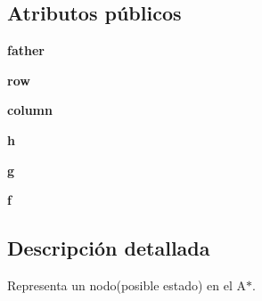 \subsection*{\-Atributos públicos}
\begin{DoxyCompactItemize}
\item 
\hypertarget{classengine_1_1astar_1_1Nodo_a2bccf625e0e53d558ea912c6a22961f4}{
{\bfseries father}}
\label{classengine_1_1astar_1_1Nodo_a2bccf625e0e53d558ea912c6a22961f4}

\item 
\hypertarget{classengine_1_1astar_1_1Nodo_a3d42a34fb8f7ec3e279e94fac8f38cda}{
{\bfseries row}}
\label{classengine_1_1astar_1_1Nodo_a3d42a34fb8f7ec3e279e94fac8f38cda}

\item 
\hypertarget{classengine_1_1astar_1_1Nodo_adca0b6a4acfbaeb84f5716b76b493d91}{
{\bfseries column}}
\label{classengine_1_1astar_1_1Nodo_adca0b6a4acfbaeb84f5716b76b493d91}

\item 
\hypertarget{classengine_1_1astar_1_1Nodo_a93acca2eb6056e5932deb63eeea7b47e}{
{\bfseries h}}
\label{classengine_1_1astar_1_1Nodo_a93acca2eb6056e5932deb63eeea7b47e}

\item 
\hypertarget{classengine_1_1astar_1_1Nodo_afbe9e8e53109f1d8c319446478b2140d}{
{\bfseries g}}
\label{classengine_1_1astar_1_1Nodo_afbe9e8e53109f1d8c319446478b2140d}

\item 
\hypertarget{classengine_1_1astar_1_1Nodo_a8fcebe0c0a56e62b9e1441325aff1605}{
{\bfseries f}}
\label{classengine_1_1astar_1_1Nodo_a8fcebe0c0a56e62b9e1441325aff1605}

\end{DoxyCompactItemize}


\subsection{\-Descripción detallada}
\-Representa un nodo(posible estado) en el \-A$\ast$. 

